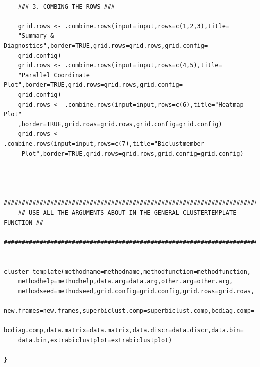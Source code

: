 \documentclass[a4paper]{article}\usepackage[]{graphicx}\usepackage[]{color}
\begin{document}
\begin{verbatim}
	
	### 3. COMBING THE ROWS ###
	
	grid.rows <- .combine.rows(input=input,rows=c(1,2,3),title=
    "Summary & Diagnostics",border=TRUE,grid.rows=grid.rows,grid.config=
    grid.config)
	grid.rows <- .combine.rows(input=input,rows=c(4,5),title=
    "Parallel Coordinate Plot",border=TRUE,grid.rows=grid.rows,grid.config=
    grid.config)
	grid.rows <- .combine.rows(input=input,rows=c(6),title="Heatmap Plot"
    ,border=TRUE,grid.rows=grid.rows,grid.config=grid.config)
	grid.rows <- .combine.rows(input=input,rows=c(7),title="Biclustmember
     Plot",border=TRUE,grid.rows=grid.rows,grid.config=grid.config)
	
	
	
	#########################################################################
	## USE ALL THE ARGUMENTS ABOUT IN THE GENERAL CLUSTERTEMPLATE FUNCTION ##
	#########################################################################
	
	cluster_template(methodname=methodname,methodfunction=methodfunction,
    methodhelp=methodhelp,data.arg=data.arg,other.arg=other.arg,
    methodseed=methodseed,grid.config=grid.config,grid.rows=grid.rows,
    new.frames=new.frames,superbiclust.comp=superbiclust.comp,bcdiag.comp=
    bcdiag.comp,data.matrix=data.matrix,data.discr=data.discr,data.bin=
    data.bin,extrabiclustplot=extrabiclustplot)
	
}

\end{verbatim}
\end{document}
